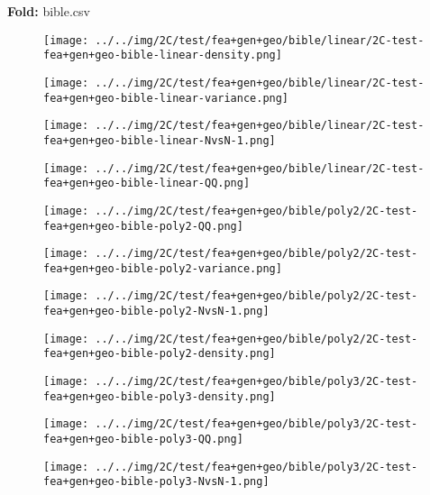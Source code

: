 \textbf{Fold:} bible.csv
\begin{figure}[H]
\centering	\texttt{[image: ../../img/2C/test/fea+gen+geo/bible/linear/2C-test-fea+gen+geo-bible-linear-density.png]}
\end{figure}
\begin{figure}[H]
\centering	\texttt{[image: ../../img/2C/test/fea+gen+geo/bible/linear/2C-test-fea+gen+geo-bible-linear-variance.png]}
\end{figure}
\begin{figure}[H]
\centering	\texttt{[image: ../../img/2C/test/fea+gen+geo/bible/linear/2C-test-fea+gen+geo-bible-linear-NvsN-1.png]}
\end{figure}
\begin{figure}[H]
\centering	\texttt{[image: ../../img/2C/test/fea+gen+geo/bible/linear/2C-test-fea+gen+geo-bible-linear-QQ.png]}
\end{figure}
\begin{figure}[H]
\centering	\texttt{[image: ../../img/2C/test/fea+gen+geo/bible/poly2/2C-test-fea+gen+geo-bible-poly2-QQ.png]}
\end{figure}
\begin{figure}[H]
\centering	\texttt{[image: ../../img/2C/test/fea+gen+geo/bible/poly2/2C-test-fea+gen+geo-bible-poly2-variance.png]}
\end{figure}
\begin{figure}[H]
\centering	\texttt{[image: ../../img/2C/test/fea+gen+geo/bible/poly2/2C-test-fea+gen+geo-bible-poly2-NvsN-1.png]}
\end{figure}
\begin{figure}[H]
\centering	\texttt{[image: ../../img/2C/test/fea+gen+geo/bible/poly2/2C-test-fea+gen+geo-bible-poly2-density.png]}
\end{figure}
\begin{figure}[H]
\centering	\texttt{[image: ../../img/2C/test/fea+gen+geo/bible/poly3/2C-test-fea+gen+geo-bible-poly3-density.png]}
\end{figure}
\begin{figure}[H]
\centering	\texttt{[image: ../../img/2C/test/fea+gen+geo/bible/poly3/2C-test-fea+gen+geo-bible-poly3-QQ.png]}
\end{figure}
\begin{figure}[H]
\centering	\texttt{[image: ../../img/2C/test/fea+gen+geo/bible/poly3/2C-test-fea+gen+geo-bible-poly3-NvsN-1.png]}
\end{figure}
